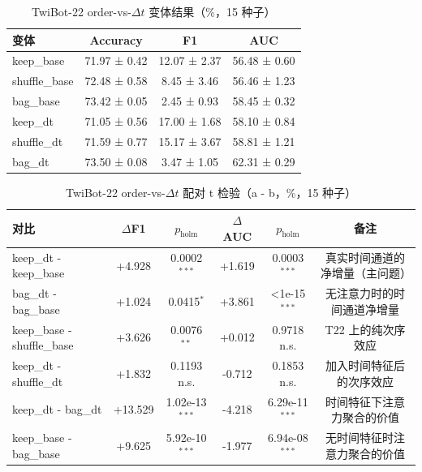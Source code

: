 
\begin{table}[htbp]
\centering
\caption{TwiBot-22 order-vs-$\Delta t$ 变体结果（\%，15 种子）}
\begin{tabular}{lccc}
\toprule
变体 & Accuracy & F1 & AUC \\
\midrule
keep_base & 71.97 ± 0.42 & 12.07 ± 2.37 & 56.48 ± 0.60 \\
shuffle_base & 72.48 ± 0.58 & 8.45 ± 3.46 & 56.46 ± 1.23 \\
bag_base & 73.42 ± 0.05 & 2.45 ± 0.93 & 58.45 ± 0.32 \\
keep_dt & 71.05 ± 0.56 & 17.00 ± 1.68 & 58.10 ± 0.84 \\
shuffle_dt & 71.59 ± 0.77 & 15.17 ± 3.67 & 58.81 ± 1.21 \\
bag_dt & 73.50 ± 0.08 & 3.47 ± 1.05 & 62.31 ± 0.29 \\
\bottomrule
\end{tabular}
\end{table}


\begin{table}[htbp]
\centering
\caption{TwiBot-22 order-vs-$\Delta t$ 配对 t 检验（a - b，\%，15 种子）}
\begin{tabular}{lccccc}
\toprule
对比 & $\Delta$F1 & $p_{\text{holm}}$ & $\Delta$AUC & $p_{\text{holm}}$ & 备注 \\
\midrule
keep_dt - keep_base & +4.928 & 0.0002$^{***}$ & +1.619 & 0.0003$^{***}$ & 真实时间通道的净增量（主问题） \\
bag_dt - bag_base & +1.024 & 0.0415$^{*}$ & +3.861 & <1e-15$^{***}$ & 无注意力时的时间通道净增量 \\
keep_base - shuffle_base & +3.626 & 0.0076$^{**}$ & +0.012 & 0.9718 n.s. & T22 上的纯次序效应 \\
keep_dt - shuffle_dt & +1.832 & 0.1193 n.s. & -0.712 & 0.1853 n.s. & 加入时间特征后的次序效应 \\
keep_dt - bag_dt & +13.529 & 1.02e-13$^{***}$ & -4.218 & 6.29e-11$^{***}$ & 时间特征下注意力聚合的价值 \\
keep_base - bag_base & +9.625 & 5.92e-10$^{***}$ & -1.977 & 6.94e-08$^{***}$ & 无时间特征时注意力聚合的价值 \\
\bottomrule
\end{tabular}
\end{table}